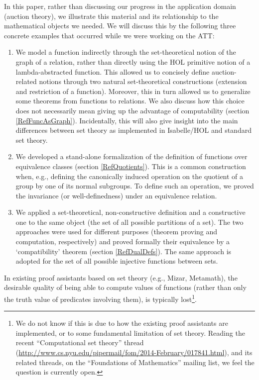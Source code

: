 \documentclass[
]{llncs}
\newcommand{\junction}{compatibility}
\newcommand{\I}{Isabelle}
\newcommand{\M}{Mizar}
\newcommand{\query}[1]{\marginnote{\raggedright\footnotesize\itshape\hrule\smallskip{#1}\smallskip\hrule}}\renewcommand{\query}[1]{} \newcommand{\rnote}[1]{\query{#1}}
\newcommand{\lnote}[1]{\reversemarginpar\query{#1}\normalmarginpar}
\begin{document}
In this paper, rather than discussing our progress in the application domain (auction theory), we illustrate this material and its relationship to the mathematical objects we needed.
We will discuss this by the following three concrete examples that occurred while we were working on the ATT:
\begin{enumerate}
\item
We model a function indirectly through the set-theoretical notion of the graph of a relation, rather than directly using the HOL primitive notion of a lambda-abstracted function. This allowed us to concisely define auction-related notions through two natural set-theoretical constructions (extension and restriction of a function). Moreover, this in turn allowed us to generalize some theorems from functions to relations. 
We also discuss how this choice does not necessarily mean giving up the advantage of computability (section \ref{RefFuncAsGraph}).
Incidentally, this will also give insight into the main differences between set theory as implemented in \I{}/HOL and standard set theory. 
\item
We developed a stand-alone formalization of the definition of functions over equivalence classes (section \ref{RefQuotients}). 
This is a common construction when, e.g., defining the canonically induced operation on the quotient of a group by one of its normal subgroups.
To define such an operation, we proved the invariance (or well-definedness) under an equivalence relation.
\item
\label{RefDualDefsItem}
We applied a set-theoretical, non-constructive definition and a constructive one to the same object (the set of all possible partitions of a set). The two approaches were used for different purposes (theorem proving and computation, respectively) and proved formally their equivalence by a 
`\junction' theorem (section \ref{RefDualDefs}).
The same approach is adopted for the set of all possible injective functions between sets.
\end{enumerate}
In existing proof assistants based on set theory (e.g., \M{}, Metamath), the desirable quality of being able to compute values of functions (rather than only the truth value of predicates involving them), is typically lost\lnote{MC: Added footnote for reviewer3.}\footnote{We do not know if this is due to how the existing proof assistants are implemented, or to some fundamental limitation of set theory. 
Reading the recent ``Computational set theory{}'' thread (\url{http://www.cs.nyu.edu/pipermail/fom/2014-February/017841.html}), and its related threads, on the ``Foundations of Mathematics'' mailing list, we feel the question is currently 
open.}.
\end{document}
